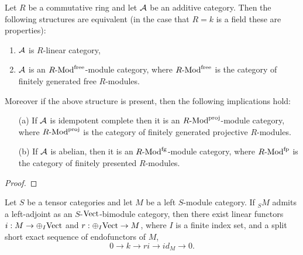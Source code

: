 \documentclass{amsart}
\begin{document}
\begin{proposition}
	Let $R$ be a commutative ring and let $\mathcal A$ be an additive category. Then the following structures are equivalent (in the case that $R= k$ is a field these are properties): 
	\begin{enumerate}
		\item $\mathcal A$ is $R$-linear category,
		\item $\mathcal A$ is an $\Mod{R}{}^\textrm{free}$-module category, where $\Mod{R}{}^\textrm{free}$ is the category of finitely generated free $R$-modules.  
	\end{enumerate}
	Moreover if the above structure is present, then the following implications hold: 
	\begin{enumerate}
		\item [(a)] If $\mathcal A$ is idempotent complete then it is an $\Mod{R}{}^\textrm{proj}$-module category, where $\Mod{R}{}^\textrm{proj}$ is the category of finitely generated projective $R$-modules.  
		\item [(b)] If $\mathcal A$ is abelian, then it is an $\Mod{R}{}^\textrm{fg}$-module category, where $\Mod{R}{}^\textrm{fp}$ is the category of finitely presented $R$-modules.
		
	\end{enumerate}
\end{proposition}

\begin{proof}
\end{proof}




\begin{proposition}
	Let $S$ be a tensor categories and let $M$ be a left $S$-module category.  If ${}_S M$ admits a left-adjoint as an $S$-$\mathrm{Vect}$-bimodule category, then there exist linear functors  $i: M \to \oplus_I \mathrm{Vect}$ and $r: \oplus_I \mathrm{Vect} \to M$, where $I$ is a finite index set, and  a split short exact sequence of endofunctors of $M$,
	\begin{equation*}
		0 \to k \to ri \to id_M \to 0.
	\end{equation*}
	
	
\end{proposition}
\end{document}
